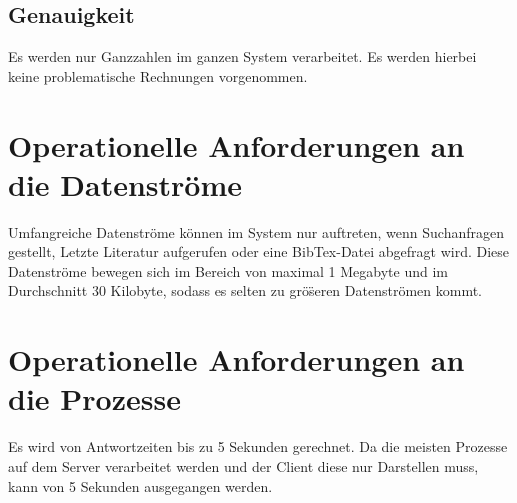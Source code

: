 \subsection{Genauigkeit}
Es werden nur Ganzzahlen im ganzen System verarbeitet. Es werden hierbei keine problematische Rechnungen vorgenommen.

\section{Operationelle Anforderungen an die Datenströme}
Umfangreiche Datenstr\"ome k\"onnen im System nur auftreten, wenn Suchanfragen gestellt, Letzte Literatur aufgerufen oder eine BibTex-Datei abgefragt wird. 
Diese Datenstr\"ome bewegen sich im Bereich von maximal 1 Megabyte und im Durchschnitt 30 Kilobyte, sodass es selten
zu gr\"o\"seren Datenstr\"omen kommt.


\section{Operationelle Anforderungen an die Prozesse}
Es wird von Antwortzeiten bis zu 5 Sekunden gerechnet. Da die meisten Prozesse auf dem Server verarbeitet werden und der Client diese nur Darstellen muss, 
kann von 5 Sekunden ausgegangen werden. 
